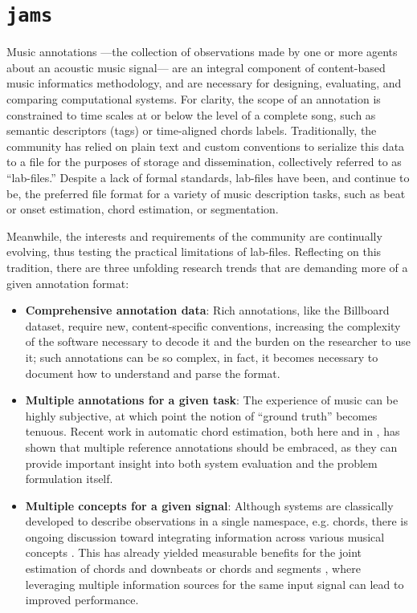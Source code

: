 \section{\texttt{jams}}
\label{sec:jams}

Music annotations ---the collection of observations made by one or more agents about an acoustic music signal--- are an integral component of content-based music informatics methodology, and are necessary for designing, evaluating, and comparing computational systems.
For clarity, the scope of an annotation is constrained to time scales at or below the level of a complete song, such as semantic descriptors (tags) or time-aligned chords labels.
Traditionally, the community has relied on plain text and custom conventions to serialize this data to a file for the purposes of storage and dissemination, collectively referred to as ``lab-files.''
Despite a lack of formal standards, lab-files have been, and continue to be, the preferred file format for a variety of music description tasks, such as beat or onset estimation, chord estimation, or segmentation.

Meanwhile, the interests and requirements of the community are continually evolving, thus testing the practical limitations of lab-files.
Reflecting on this tradition, there are three unfolding research trends that are demanding more of a given annotation format:

\begin{itemize}
\item \textbf{Comprehensive annotation data}:
Rich annotations, like the Billboard dataset\cite{Burgoyne2011expert}, require new, content-specific conventions, increasing the complexity of the software necessary to decode it and the burden on the researcher to use it; such annotations can be so complex, in fact, it becomes necessary to document how to understand and parse the format\cite{De2012parsing}.

\item \textbf{Multiple annotations for a given task}:
The experience of music can be highly subjective, at which point the notion of ``ground truth'' becomes tenuous.
Recent work in automatic chord estimation, both here and in \cite{ni2013understanding}, has shown that multiple reference annotations should be embraced, as they can provide important insight into both system evaluation and the problem formulation itself.

\item \textbf{Multiple concepts for a given signal}:
Although systems are classically developed to describe observations in a single namespace, e.g. chords, there is ongoing discussion toward integrating information across various musical concepts \cite{vincent2010roadmap}.
This has already yielded measurable benefits for the joint estimation of chords and downbeats \cite{papadopoulos2011joint} or chords and segments \cite{mauch2009using}, where leveraging multiple information sources for the same input signal can lead to improved performance.
\end{itemize}


